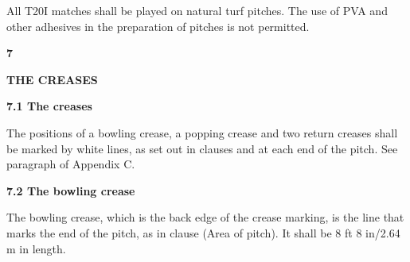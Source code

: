 \documentclass[12pt]{article}
\begin{document}
\vspace{\baselineskip}
\begin{adjustwidth}{0.0in}{0.22in}
{\fontsize{9pt}{10.8pt}\selectfont All T20I matches shall be played on natural turf pitches. The use of PVA and other adhesives in the preparation of pitches is not permitted.\par}\par

\end{adjustwidth}


\vspace{\baselineskip}
{\fontsize{16pt}{19.2pt}\selectfont \textbf{7 \tabto{0.29in} }{\fontsize{15pt}{18.0pt}\selectfont \textbf{THE CREASES}\par}\par}\par


\vspace{\baselineskip}
{\fontsize{11pt}{13.2pt}\selectfont \textbf{7.1 \tabto{0.47in} The creases}\par}\par


\vspace{\baselineskip}
\begin{adjustwidth}{0.0in}{0.21in}
{\fontsize{9pt}{10.8pt}\selectfont The positions of a bowling crease, a popping crease and two return creases shall be marked by white lines, as set out in clauses and at each end of the pitch. See paragraph of Appendix C.\par}\par

\end{adjustwidth}


\vspace{\baselineskip}
{\fontsize{11pt}{13.2pt}\selectfont \textbf{7.2 \tabto{0.47in} The bowling crease}\par}\par


\vspace{\baselineskip}
\begin{adjustwidth}{0.0in}{0.21in}
{\fontsize{9pt}{10.8pt}\selectfont The bowling crease, which is the back edge of the crease marking, is the line that marks the end of the pitch, as in clause (Area of pitch). It shall be 8 ft 8 in/2.64 m in length.\par}\par

\end{adjustwidth}
\end{document}
